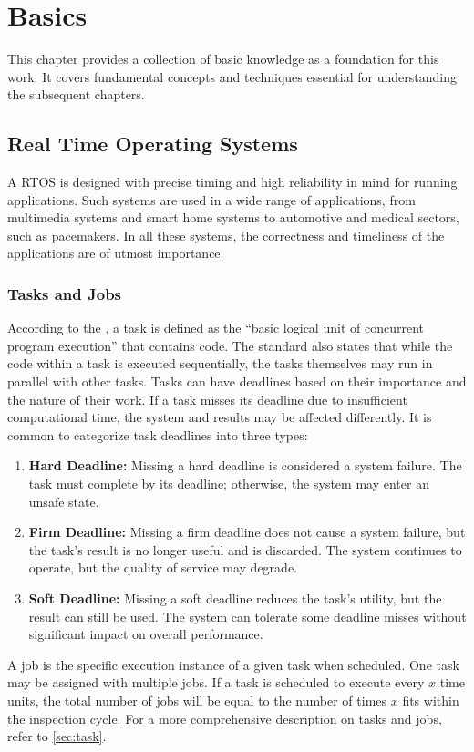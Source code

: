 \chapter{Basics}\label{ch:basics}
This chapter provides a collection of basic knowledge as a foundation for this work. It covers fundamental concepts and techniques essential for understanding the subsequent chapters.

\section{Real Time Operating Systems}\label{sec:rtos}
A \ac{RTOS} is designed with precise timing and high reliability in mind for running applications\cite{stankovicRealtimeOperatingSystems2004}. Such systems are used in a wide range of applications, from multimedia systems and smart home systems to automotive and medical sectors, such as pacemakers\cite{hambardeSurveyRealTime2014}. In all these systems, the correctness and timeliness of the applications are of utmost importance\cite{hambardeSurveyRealTime2014}.

\subsection{Tasks and Jobs}\label{sec:tasks_and_jobs}
According to the \textcite{IEEEStandardRealTime}, a task is defined as the ``basic logical unit of concurrent program execution'' that contains code. The standard also states that while the code within a task is executed sequentially, the tasks themselves may run in parallel with other tasks. Tasks can have deadlines based on their importance and the nature of their work. If a task misses its deadline due to insufficient computational time, the system and results may be affected differently. It is common to categorize task deadlines into three types\cite{dengSchedulingRealtimeApplications1997,abeniIntegratingMultimediaApplications1998,shindeComparisonRealTime2017}:
\begin{enumerate}
	\item \textbf{Hard Deadline:}
		  Missing a hard deadline is considered a system failure. The task must complete by its deadline; otherwise, the system may enter an unsafe state.
	\item \textbf{Firm Deadline:}
		  Missing a firm deadline does not cause a system failure, but the task's result is no longer useful and is discarded. The system continues to operate, but the quality of service may degrade.
	\item \textbf{Soft Deadline:}
		  Missing a soft deadline reduces the task's utility, but the result can still be used. The system can tolerate some deadline misses without significant impact on overall performance.
\end{enumerate}
A job is the specific execution instance of a given task when scheduled. One task may be assigned with multiple jobs. If a task is scheduled to execute every $x$ time units, the total number of jobs will be equal to the number of times $x$ fits within the inspection cycle. For a more comprehensive description on tasks and jobs, refer to \cref{sec:task}.

